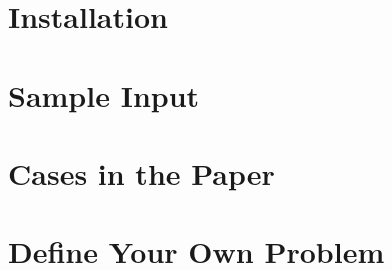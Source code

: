 \documentclass{llncs}
\begin{document}
\section{Installation}

\section{Sample Input}

\section{Cases in the Paper}

\section{Define Your Own Problem}





\end{document}
